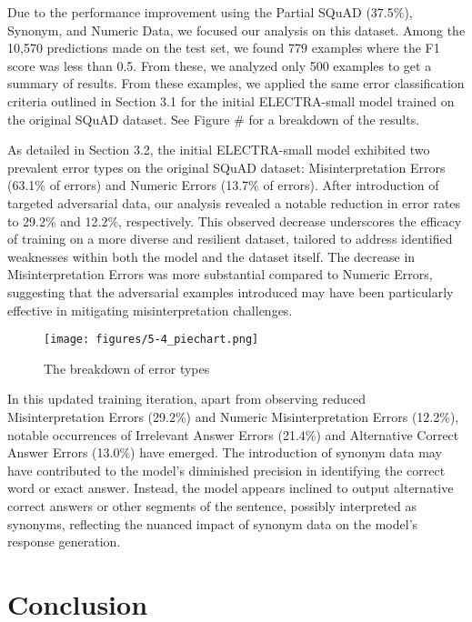 \documentclass{article}
\begin{document}
Due to the performance improvement using the Partial SQuAD
(37.5\%), Synonym, and Numeric Data, we focused our analysis
on this dataset. Among the 10,570 predictions made on the test
set, we found 779 examples where the F1 score was less than 0.5.
From these, we analyzed only 500 examples to get a summary of
results. From these examples, we applied the same error
classification criteria outlined in Section 3.1 for the initial
ELECTRA-small model trained on the original SQuAD dataset.
See Figure \# for a breakdown of the results.

As detailed in Section 3.2, the initial ELECTRA-small model
exhibited two prevalent error types on the original SQuAD
dataset: Misinterpretation Errors (63.1\% of errors) and
Numeric Errors (13.7\% of errors). After introduction of
targeted adversarial data, our analysis revealed a notable
reduction in error rates to 29.2\% and 12.2\%, respectively.
This observed decrease underscores the efficacy of training
on a more diverse and resilient dataset, tailored to address
identified weaknesses within both the model and the dataset
itself. The decrease in Misinterpretation Errors was more
substantial compared to Numeric Errors, suggesting that the
adversarial examples introduced may have been particularly
effective in mitigating misinterpretation challenges.

\begin{figure}[ht]
  \centering
  \texttt{[image: figures/5-4\_piechart.png]}
  \caption{The breakdown of error types}
  \label{fig:piechart}
\end{figure}

In this updated training iteration, apart from observing
reduced Misinterpretation Errors (29.2\%) and Numeric
Misinterpretation Errors (12.2\%), notable occurrences of
Irrelevant Answer Errors (21.4\%) and Alternative Correct
Answer Errors (13.0\%) have emerged. The introduction of
synonym data may have contributed to the model's diminished
precision in identifying the correct word or exact answer.
Instead, the model appears inclined to output alternative
correct answers or other segments of the sentence, possibly
interpreted as synonyms, reflecting the nuanced impact of
synonym data on the model's response generation.



\section{Conclusion}
\end{document}
